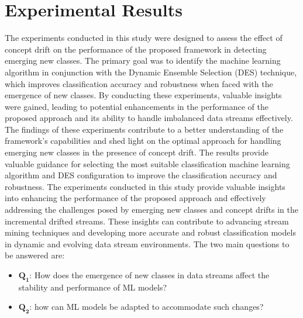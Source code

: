 %
%



\section{Experimental Results}
\label{sec:4_5_Expsetup}

The experiments conducted in this study were designed to assess the effect of concept drift on the performance of the proposed framework in detecting emerging new classes. The primary goal was to identify the machine learning algorithm in conjunction with the Dynamic Ensemble Selection (DES) technique, which improves classification accuracy and robustness when faced with the emergence of new classes. By conducting these experiments, valuable insights were gained, leading to potential enhancements in the performance of the proposed approach and its ability to handle imbalanced data streams effectively. The findings of these experiments contribute to a better understanding of the framework's capabilities and shed light on the optimal approach for handling emerging new classes in the presence of concept drift. The results provide valuable guidance for selecting the most suitable classification machine learning algorithm and DES configuration to improve the classification accuracy and robustness. The experiments conducted in this study provide valuable insights into enhancing the performance of the proposed approach and effectively addressing the challenges posed by emerging new classes and concept drifts in the incremental drifted streams. These insights can contribute to advancing stream mining techniques and developing more accurate and robust classification models in dynamic and evolving data stream environments. The two main questions to be answered are:

\begin{itemize}
  \setlength{\itemindent}{-.5in}
  
      \item $\pmb{Q_1}$: How does the emergence of new classes in data streams affect the stability and performance of ML models?
      \item  $\pmb{Q_2}$: how can ML models be adapted to accommodate such changes?
  \end{itemize}

